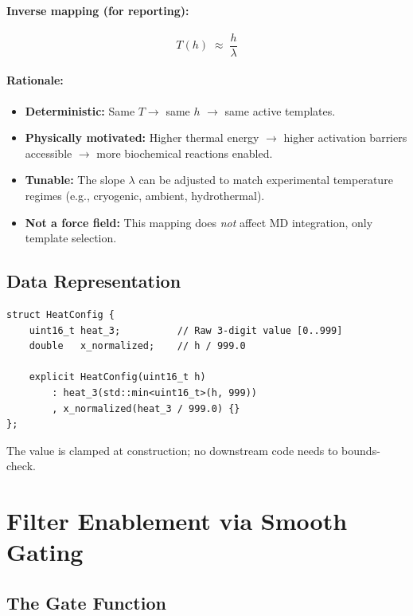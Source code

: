 \documentclass[11pt]{article}
\begin{document}
\paragraph{Inverse mapping (for reporting):}

\begin{equation}
\label{eq:heat_to_temp}
T(h) \;\approx\; \frac{h}{\lambda}
\end{equation}

\paragraph{Rationale:}
\begin{itemize}
\item \textbf{Deterministic:} Same $T \to$ same $h$ $\to$ same active templates.
\item \textbf{Physically motivated:} Higher thermal energy $\to$ higher
      activation barriers accessible $\to$ more biochemical reactions enabled.
\item \textbf{Tunable:} The slope $\lambda$ can be adjusted to match
      experimental temperature regimes (e.g., cryogenic, ambient,
      hydrothermal).
\item \textbf{Not a force field:} This mapping does \textit{not} affect
      MD integration, only template selection.
\end{itemize}

\subsection{Data Representation}

\begin{lstlisting}
struct HeatConfig {
    uint16_t heat_3;          // Raw 3-digit value [0..999]
    double   x_normalized;    // h / 999.0

    explicit HeatConfig(uint16_t h)
        : heat_3(std::min<uint16_t>(h, 999))
        , x_normalized(heat_3 / 999.0) {}
};
\end{lstlisting}

The value is clamped at construction; no downstream code needs to
bounds-check.

\section{Filter Enablement via Smooth Gating}

\subsection{The Gate Function}
\end{document}
